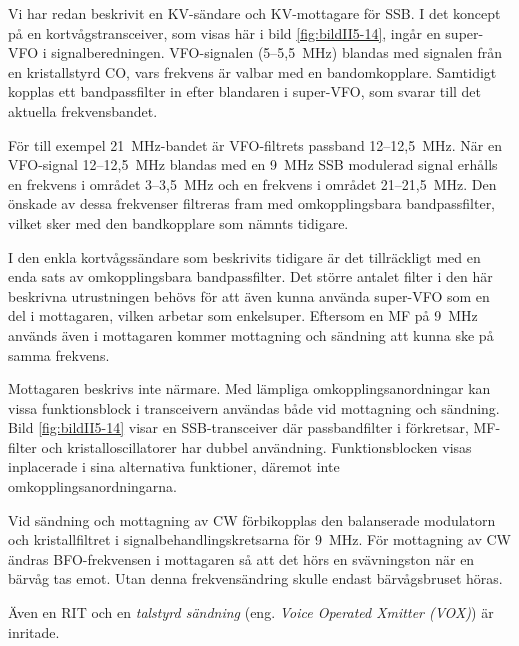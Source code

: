Vi har redan beskrivit en KV-sändare och KV-mottagare för SSB.
I det koncept på en kortvågstransceiver, som visas här i
bild \ref{fig:bildII5-14}, ingår en super-VFO i signalberedningen.
VFO-signalen (5--5,5~MHz) blandas med signalen från en kristallstyrd CO,
vars frekvens är valbar med en bandomkopplare.
Samtidigt kopplas ett bandpassfilter in efter blandaren i super-VFO,
som svarar till det aktuella frekvensbandet.

För till exempel 21~MHz-bandet är VFO-filtrets passband 12--12,5~MHz.
När en VFO-signal 12--12,5~MHz blandas med en 9~MHz SSB modulerad signal
erhålls en frekvens i området 3--3,5~MHz och en frekvens i området 21--21,5~MHz.
Den önskade av dessa frekvenser filtreras fram med omkopplingsbara
bandpassfilter, vilket sker med den bandkopplare som nämnts tidigare.

I den enkla kortvågssändare som beskrivits tidigare är det
tillräckligt med en enda sats av omkopplingsbara bandpassfilter.
Det större antalet filter i den här beskrivna utrustningen behövs för att
även kunna använda super-VFO som en del i mottagaren, vilken arbetar
som enkelsuper.
Eftersom en MF på 9~MHz används även i mottagaren kommer mottagning och
sändning att kunna ske på samma frekvens.

Mottagaren beskrivs inte närmare.
Med lämpliga omkopplingsanordningar kan vissa funktionsblock i
transceivern användas både vid mottagning och sändning.
Bild \ref{fig:bildII5-14} visar en SSB-transceiver där passbandfilter i
förkretsar, MF-filter och kristalloscillatorer har dubbel användning.
Funktionsblocken visas inplacerade i sina alternativa
funktioner, däremot inte omkopplingsanordningarna.

Vid sändning och mottagning av CW förbikopplas den balanserade
modulatorn och kristallfiltret i signalbehandlingskretsarna för 9~MHz.
För mottagning av CW ändras BFO-frekvensen i mottagaren så att
det hörs en svävningston när en bärvåg tas emot.
Utan denna frekvensändring skulle endast bärvågsbruset höras.

Även en RIT och en \emph{talstyrd sändning} (eng.
\emph{Voice Operated Xmitter (VOX)}) är inritade.

